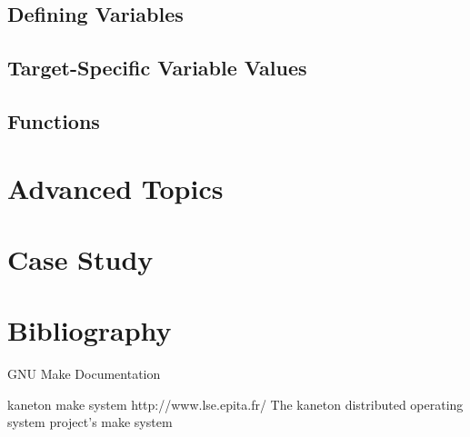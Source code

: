 \documentclass[8pt]{beamer}
\begin{document}

\subsection{Defining Variables}


\subsection{Target-Specific Variable Values}


\subsection{Functions}


\section{Advanced Topics}

\section{Case Study}

%
%

\section{Bibliography}

\begin{thebibliography}{3}
    GNU Make Documentation

    kaneton make system
    \newblock http://www.lse.epita.fr/
    \newblock The kaneton distributed operating system project's make system
\end{thebibliography}
\end{document}

